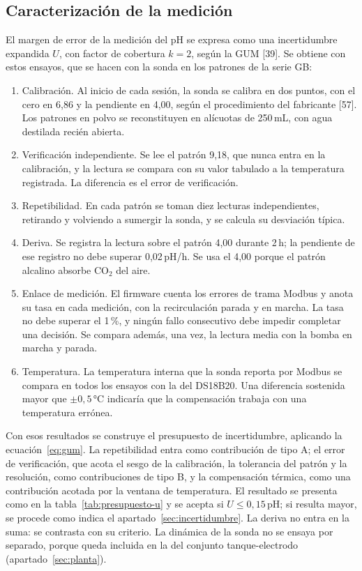\subsection{Caracterización de la medición}\label{sec:carmed}

El margen de error de la medición del pH se expresa como una incertidumbre expandida $U$, con factor de cobertura $k=2$, según la GUM [39]. Se obtiene con estos ensayos, que se hacen con la sonda en los patrones de la serie GB:
\begin{enumerate}
\item Calibración. Al inicio de cada sesión, la sonda se calibra en dos puntos, con el cero en 6,86 y la pendiente en 4,00, según el procedimiento del fabricante [57]. Los patrones en polvo se reconstituyen en alícuotas de 250\,mL, con agua destilada recién abierta.
\item Verificación independiente. Se lee el patrón 9,18, que nunca entra en la calibración, y la lectura se compara con su valor tabulado a la temperatura registrada. La diferencia es el error de verificación.
\item Repetibilidad. En cada patrón se toman diez lecturas independientes, retirando y volviendo a sumergir la sonda, y se calcula su desviación típica.
\item Deriva. Se registra la lectura sobre el patrón 4,00 durante 2\,h; la pendiente de ese registro no debe superar 0,02\,pH/h. Se usa el 4,00 porque el patrón alcalino absorbe CO$_2$ del aire.
\item Enlace de medición. El firmware cuenta los errores de trama Modbus y anota su tasa en cada medición, con la recirculación parada y en marcha. La tasa no debe superar el 1\,\%, y ningún fallo consecutivo debe impedir completar una decisión. Se compara además, una vez, la lectura media con la bomba en marcha y parada.
\item Temperatura. La temperatura interna que la sonda reporta por Modbus se compara en todos los ensayos con la del DS18B20. Una diferencia sostenida mayor que $\pm0{,}5$\,°C indicaría que la compensación trabaja con una temperatura errónea.
\end{enumerate}
Con esos resultados se construye el presupuesto de incertidumbre, aplicando la ecuación~\eqref{eq:gum}. La repetibilidad entra como contribución de tipo A; el error de verificación, que acota el sesgo de la calibración, la tolerancia del patrón y la resolución, como contribuciones de tipo B, y la compensación térmica, como una contribución acotada por la ventana de temperatura. El resultado se presenta como en la tabla~\ref{tab:presupuesto-u} y se acepta si $U\le0{,}15$\,pH; si resulta mayor, se procede como indica el apartado~\ref{sec:incertidumbre}. La deriva no entra en la suma: se contrasta con su criterio. La dinámica de la sonda no se ensaya por separado, porque queda incluida en la del conjunto tanque-electrodo (apartado~\ref{sec:planta}).

